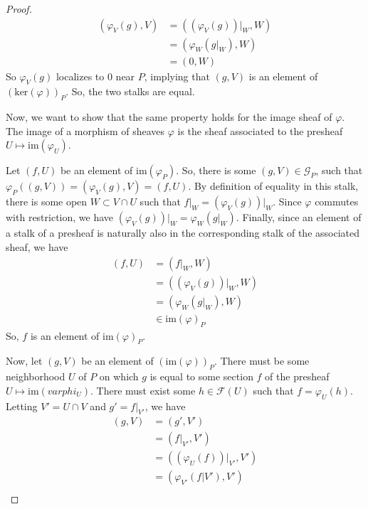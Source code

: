 \documentclass[12pt]{article}
\theoremstyle{definition}
\newenvironment{problem}[2][Problem]{\begin{trivlist}
\item[\hskip \labelsep {\bfseries #1}\hskip \labelsep {\bfseries #2.}]}{\end{trivlist}}
\begin{document}
\begin{problem}{2}
\begin{enumerate}[label=(\alph*)]
\begin{proof}
            \begin{align*}
                (\varphi_V(g),V) &= ((\varphi_V(g))\lvert_W, W)\\
                &=(\varphi_W(g\lvert_W),W)\\
                &=(0, W)
            \end{align*}
            So $\varphi_V(g)$ localizes to $0$ near $P$, implying that $(g,V)$ is an element of $(\text{ker}(\varphi))_P$. So, the two stalks are equal.
            \par Now, we want to show that the same property holds for the image sheaf of $\varphi$. The image of a morphism of sheaves $\varphi$ is the sheaf associated to the presheaf $U \mapsto \text{im}(\varphi_U)$. 
            \par Let $(f, U)$ be an element of $\text{im}(\varphi_P)$. So, there is some $(g, V) \in \mathcal G_P$, such that $\varphi_P( (g,V)) = (\varphi_V(g),V) = (f,U)$. By definition of equality in this stalk, there is some open $W \subset V \cap U$ such that $f \lvert_W = (\varphi_V(g))\lvert_W$. Since $\varphi$ commutes with restriction, we have $(\varphi_V(g))\lvert_W = \varphi_W(g\lvert_W)$. Finally, since an element of a stalk of a presheaf is naturally also in the corresponding stalk of the associated sheaf, we have
            \begin{align*}
                (f,U) &= (f\lvert_W, W)\\
                &= ((\varphi_V(g))\lvert_W, W)\\
                &= (\varphi_W(g\lvert_W), W)\\
                &\in \text{im}(\varphi)_P
            \end{align*}
            So, $f$ is an element of $\text{im}(\varphi)_P$.
            \par Now, let $(g, V)$ be an element of $(\text{im}(\varphi))_P$. There must be some neighborhood $U$ of $P$ on which $g$ is equal to some section $f$ of the presheaf $U \mapsto \text{im}(varphi_U)$. There must exist some $h \in \mathcal F(U)$ such that $f = \varphi_U(h)$. Letting $V' = U \cap V$ and $g' = f\lvert_{V'}$, we have
            \begin{align*}
                (g,V) &= (g',V')\\
                &= (f\lvert_{V'}, V')\\
                &= ((\varphi_U(f))\lvert_{V'}, V')\\
                &= (\varphi_{V'}(f\lvert{V'}), V')\\

\end{align*}
\end{proof}
\end{enumerate}
\end{problem}
\end{document}

